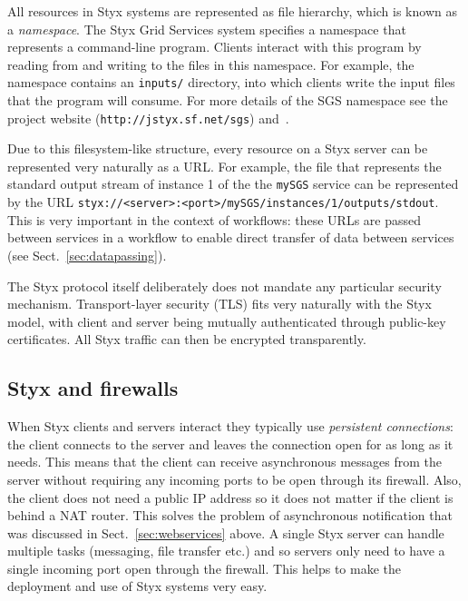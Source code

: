 \documentclass{llncs}
\begin{document}
All resources in Styx systems are represented as file hierarchy, which is known as a {\em namespace\/}.  The Styx Grid Services system specifies a namespace that represents a command-line program.  Clients interact with this program by reading from and writing to the files in this namespace.  For example, the namespace contains an {\tt inputs/} directory, into which clients write the input files that the program will consume.  For more details of the SGS namespace see the project website ({\tt http://jstyx.sf.net/sgs}) and~\cite{blower:2005}.

Due to this filesystem-like structure, every resource on a Styx server can be represented very naturally as a URL.  For example, the file that represents the standard output stream of instance 1 of the the {\tt mySGS} service can be represented by the URL {\tt styx://<server>:<port>/mySGS/instances/1/outputs/stdout}.  This is very important in the context of workflows: these URLs are passed between services in a workflow to enable direct transfer of data between services (see Sect.~\ref{sec:datapassing}).

The Styx protocol itself deliberately does not mandate any particular security mechanism.  Transport-layer security (TLS) fits very naturally with the Styx model, with client and server being mutually authenticated through public-key certificates.  All Styx traffic can then be encrypted transparently.

\subsection{Styx and firewalls}\label{sec:styx-firewalls}
When Styx clients and servers interact they typically use {\em persistent connections\/}: the client connects to the server and leaves the connection open for as long as it needs.  This means that the client can receive asynchronous messages from the server without requiring any incoming ports to be open through its firewall.  Also, the client does not need a public IP address so it does not matter if the client is behind a NAT router.  This solves the problem of asynchronous notification that was discussed in Sect.~\ref{sec:webservices} above.  A single Styx server can handle multiple tasks (messaging, file transfer etc.) and so servers only need to have a single incoming port open through the firewall.  This helps to make the deployment and use of Styx systems very easy.
\end{document}
